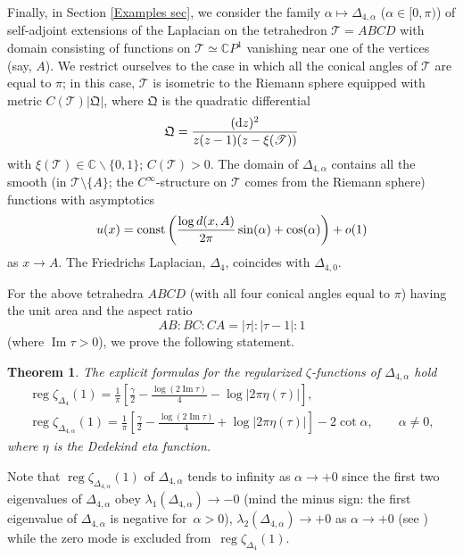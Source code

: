 \documentclass[pdftex]{sigma}
\numberwithin{equation}{section}
\newtheorem{Theorem}{Theorem}[section]
\theoremstyle{definition}
\begin{document}
Finally, in Section \ref{Examples sec}, we consider the family $\alpha\mapsto\Delta_{4,\alpha}$ ($\alpha\in[0,\pi)$) of self-adjoint extensions of the Laplacian on the tetrahedron $\mathscr{T}=ABCD$ with domain consisting of functions on $\mathscr{T}\simeq \mathbb{C}P^1$ vanishing near one of the vertices (say, $A$). We restrict ourselves to the case in which all the conical angles of $\mathscr{T}$ are equal to $\pi$; in this case, $\mathscr{T}$ is isometric to the Riemann sphere equipped with metric $C(\mathscr{T})|\mathfrak{Q}|$, where $\mathfrak{Q}$ is the quadratic differential
\[\mathfrak{Q}=\frac{({\rm d}z)^2}{z(z-1)(z-\xi(\mathscr{T}))}\]
with $\xi(\mathscr{T})\in\mathbb{C}\backslash\{0,1\}$; $C(\mathscr{T})>0$.
 The domain of $\Delta_{4,\alpha}$ contains all the smooth (in $\mathscr{T}\setminus \{A\}$; the
 $C^\infty$-structure on $\mathscr{T}$ comes from the Riemann sphere) functions with asymptotics{\samepage
\[u(x)={\rm const}\left(\frac{\log d(x,A)}{2\pi}\sin(\alpha)+\cos (\alpha)\right)+o(1)\]
as $x\to A$. The Friedrichs Laplacian, $\Delta_4$, coincides with $\Delta_{4,0}$.}

For the above tetrahedra $ABCD$ (with all four conical angles equal to $\pi$) having the unit area and the aspect ratio
\begin{equation}
\label{aspect ratio}
AB:BC:CA=|\tau|:|\tau-1|:1
\end{equation}
(where $\operatorname{Im}\tau>0$), we prove the following statement.
\begin{Theorem}
The explicit formulas for the regularized $\zeta$-functions of $\Delta_{4,\alpha}$ hold
\begin{gather}
\label{zeta tetra}
\operatorname{reg}\zeta_{\Delta_4}(1)=\frac{1}{\pi}\left[\frac{\gamma}{2}-\frac{\log (2\operatorname{Im}\tau)}{4}-\log |2\pi\eta(\tau)|\right],\\
\label{reg zeta for pseudoL on tetra}
\operatorname{reg}\zeta_{\Delta_{4,\alpha}}(1)=\frac{1}{\pi}\left[\frac{\gamma}{2}-\frac{\log (2\operatorname{Im}\tau)}{4}+\log |2\pi\eta(\tau)|\right]-2\operatorname{cot}\alpha, \qquad \alpha\ne 0 ,
\end{gather}
where $\eta$ is the Dedekind eta function.
\end{Theorem}

Note that $\operatorname{reg}\zeta_{\Delta_{4,\alpha}}(1)$ of $\Delta_{4,\alpha}$ tends to infinity as $\alpha\to +0$ since the first two eigenvalues of $\Delta_{4,\alpha}$ obey $\lambda_{1}(\Delta_{4,\alpha})\to -0$ (mind the minus sign: the first eigenvalue of $\Delta_{4, \alpha}$ is negative for~${\alpha>0}$), $\lambda_{2}(\Delta_{4,\alpha})\to +0$ as $\alpha\to+0$ (see \cite[Section 2]{CdV}) while the zero mode is excluded from~$\operatorname{reg}\zeta_{\Delta_4}(1)$.
\end{document}

